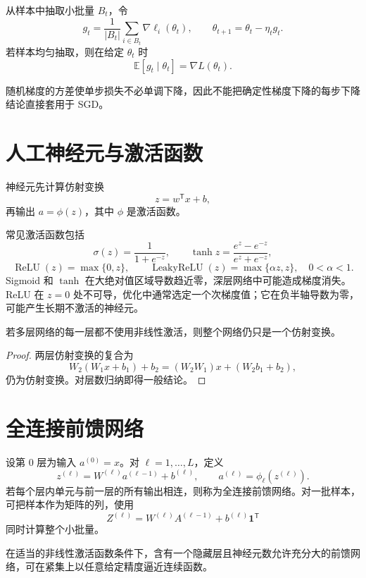 \begin{definition}[小批量随机梯度下降]
从样本中抽取小批量 $B_t$，令
\[
g_t=\frac1{|B_t|}\sum_{i\in B_t}\nabla\ell_i(\theta_t),
\qquad
\theta_{t+1}=\theta_t-\eta_tg_t.
\]
若样本均匀抽取，则在给定 $\theta_t$ 时
\[
\mathbb E[g_t\mid\theta_t]=\nabla L(\theta_t).
\]
\end{definition}

随机梯度的方差使单步损失不必单调下降，因此不能把确定性梯度下降的每步下降结论直接套用于 SGD。

\section{人工神经元与激活函数}

\begin{definition}[人工神经元]
神经元先计算仿射变换
\[
z=w^{\mathsf T}x+b,
\]
再输出 $a=\phi(z)$，其中 $\phi$ 是激活函数。
\end{definition}

常见激活函数包括
\[
\sigma(z)=\frac1{1+e^{-z}},
\qquad
\tanh z=\frac{e^z-e^{-z}}{e^z+e^{-z}},
\]
\[
\operatorname{ReLU}(z)=\max\{0,z\},
\qquad
\operatorname{LeakyReLU}(z)=\max\{\alpha z,z\},
\quad 0<\alpha<1.
\]
Sigmoid 和 $\tanh$ 在大绝对值区域导数趋近零，深层网络中可能造成梯度消失。ReLU 在 $z=0$ 处不可导，优化中通常选定一个次梯度值；它在负半轴导数为零，可能产生长期不激活的神经元。

\begin{proposition}[非线性激活的必要性]
若多层网络的每一层都不使用非线性激活，则整个网络仍只是一个仿射变换。
\end{proposition}
\begin{proof}
两层仿射变换的复合为
\[
W_2(W_1x+b_1)+b_2
=(W_2W_1)x+(W_2b_1+b_2),
\]
仍为仿射变换。对层数归纳即得一般结论。
\end{proof}

\section{全连接前馈网络}

设第 $0$ 层为输入 $a^{(0)}=x$。对 $\ell=1,\ldots,L$，定义
\[
z^{(\ell)}=W^{(\ell)}a^{(\ell-1)}+b^{(\ell)},
\qquad
a^{(\ell)}=\phi_\ell(z^{(\ell)}).
\]
若每个层内单元与前一层的所有输出相连，则称为全连接前馈网络。对一批样本，可把样本作为矩阵的列，使用
\[
Z^{(\ell)}=W^{(\ell)}A^{(\ell-1)}
+b^{(\ell)}\mathbf1^{\mathsf T}
\]
同时计算整个小批量。

\begin{theorem}
在适当的非线性激活函数条件下，含有一个隐藏层且神经元数允许充分大的前馈网络，可在紧集上以任意给定精度逼近连续函数。
\end{theorem}

